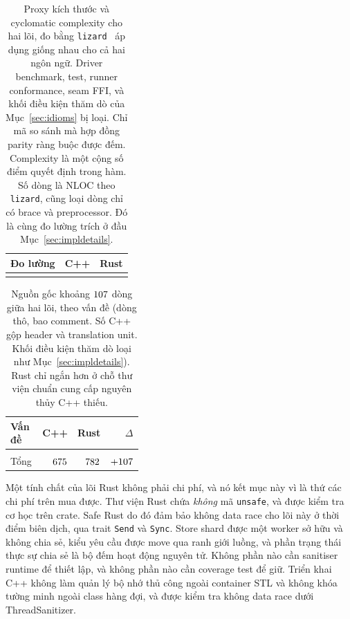 \begin{table}[H]
\centering
\small
\caption[Proxy kích thước và cyclomatic complexity cho hai lõi]{Proxy kích thước và cyclomatic complexity cho hai lõi, đo bằng
\texttt{lizard}~\cite{lizard} áp dụng giống nhau cho cả hai ngôn ngữ. Driver benchmark, test,
runner conformance, seam FFI, và khối điều kiện thăm dò của
Mục~\ref{sec:idioms} bị loại. Chỉ mã so sánh mà hợp đồng parity ràng buộc được
đếm. Complexity là một cộng số điểm quyết định trong hàm. Số dòng là
NLOC theo \texttt{lizard}, cũng loại dòng chỉ có brace và preprocessor. Đó là
cùng đo lường trích ở đầu
Mục~\ref{sec:impldetails}.\label{tab:complexity}}
\begin{tabular}{@{}l r r@{}}
\hline\hline
Đo lường & C++ & Rust \\
\hline
\\
\hline
\end{tabular}
\end{table}

\begin{table}[H]
\centering
\small
\caption[Nguồn gốc khác biệt số dòng giữa hai lõi]{Nguồn gốc khoảng $\LocGap$ dòng giữa hai lõi, theo vấn đề (dòng thô,
bao comment. Số C++ gộp header và translation unit. Khối điều kiện thăm dò loại như
Mục~\ref{sec:impldetails}). Rust chỉ ngắn hơn
ở chỗ thư viện chuẩn cung cấp nguyên thủy C++ thiếu.\label{tab:loc}}
\begin{tabular}{@{}R{0.38\linewidth} r r r@{}}
\hline\hline
Vấn đề & C++ & Rust & $\Delta$ \\
\hline
\\
\hline
Tổng                             & $675$ & $782$ & $+107$ \\
\hline
\end{tabular}
\end{table}

Một tính chất của lõi Rust không phải chi phí, và nó kết mục này vì là thứ
các chi phí trên mua được. Thư viện Rust chứa \emph{không} mã \texttt{unsafe}, và
được kiểm tra cơ học trên crate. Safe Rust do đó đảm bảo không data race cho lõi này ở
thời điểm biên dịch, qua trait \texttt{Send} và \texttt{Sync}. Store shard được một
worker sở hữu và không chia sẻ, kiểu yêu cầu được move qua ranh giới luồng, và
phần trạng thái thực sự chia sẻ là bộ đếm hoạt động nguyên tử. Không phần nào cần
sanitiser runtime để thiết lập, và không phần nào cần coverage test để giữ. Triển khai C++
không làm quản lý bộ nhớ thủ công ngoài container STL và không khóa tường minh
ngoài class hàng đợi, và được kiểm tra không data race dưới ThreadSanitizer.

